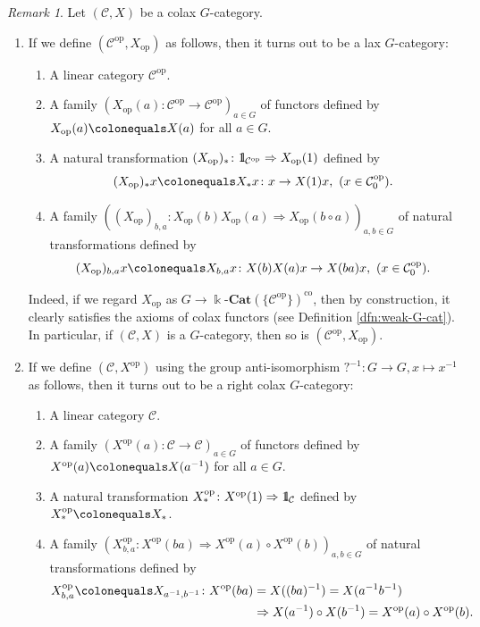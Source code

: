 \documentclass{surv-l}
\numberwithin{equation}{chapter}
\numberwithin{figure}{chapter}
\theoremstyle{plain}
\theoremstyle{definition}
\theoremstyle{remark}
\newtheorem{rmk}[thm]{Remark}
\newcommand{\id}{1\kern-.25em{\text{{\rm l}}}}
\newcommand{\kCat}{\Bbbk\text{-}\mathbf{Cat}}
\begin{document}
\begin{rmk}\label{rmk:op-action}
Let $({\mathcal{C}}, X)$ be a colax $G$-category.
\begin{enumerate}
\item
If we define $({\mathcal{C}}^{\mathrm{op}}, X_\mathrm{op})$ as follows,
then it turns out to be a lax $G$-category:
\begin{enumerate}
\item
A linear category ${\mathcal{C}}^{\mathrm{op}}$.
\item
A family $(X_\mathrm{op}(a)\colon {\mathcal{C}}^{\mathrm{op}} \to {\mathcal{C}}^{\mathrm{op}})_{a\in G}$ of functors
defined by $X_\mathrm{op}(a)\colonequals  X(a)$ for all $a \in G$.
\item
A natural transformation $(X_\mathrm{op})_*\colon \id_{{\mathcal{C}}^{\mathrm{op}}} \Rightarrow X_\mathrm{op}(1)$
defined by
\[
(X_\mathrm{op})_*x\colonequals  X_*x \colon x \to X(1)x, \ (x \in {\mathcal{C}}^{\mathrm{op}}_0).
\]
\item
A family $((X_\mathrm{op})_{b,a} \colon X_\mathrm{op}(b)X_\mathrm{op}(a) \Rightarrow X_\mathrm{op}(b \circ a))_{a,b \in G}$
of natural transformations defined by
\[
(X_\mathrm{op})_{b,a}x\colonequals  X_{b,a}x \colon X(b)X(a)x \to X(ba)x, \ (x \in {\mathcal{C}}^{\mathrm{op}}_0).
\]
\end{enumerate}
Indeed, if we regard $X_\mathrm{op}$ as $G \to \kCat(\{{\mathcal{C}}^{\mathrm{op}}\})^{\mathrm{co}}$,
then by construction,
it clearly satisfies
the axioms of colax functors (see Definition \ref{dfn:weak-G-cat}).
In particular,
if $({\mathcal{C}}, X)$ is a $G$-category, then so is $({\mathcal{C}}^{\mathrm{op}}, X_\mathrm{op})$.
\item
If we define $({\mathcal{C}}, X^{\mathrm{op}})$ using the group anti-isomorphism
$?^{-1}\colon G \to G, x \mapsto x^{-1}$ as follows, then it turns out to be
a right colax $G$-category:
\begin{enumerate}
\item
A linear category ${\mathcal{C}}$.
\item
A family $(X^{\mathrm{op}}(a)\colon {\mathcal{C}} \to {\mathcal{C}})_{a\in G}$ of functors defined by
$X^{\mathrm{op}}(a)\colonequals  X(a^{-1})$ for all $a \in G$.
\item
A natural transformation $X^{\mathrm{op}}_*\colon X^{\mathrm{op}}(1) \Rightarrow \id_{{\mathcal{C}}}$
defined by $X^{\mathrm{op}}_*\colonequals  X_*$.
\item
A family $(X^{\mathrm{op}}_{b,a} \colon X^{\mathrm{op}}(ba) \Rightarrow X^{\mathrm{op}}(a) \circ X^{\mathrm{op}}(b))_{a,b \in G}$
of natural transformations defined by
\[
\begin{aligned}
X^{\mathrm{op}}_{b,a}\colonequals  X_{a^{-1}, b^{-1}} \colon X^{\mathrm{op}}(ba) &= X((ba)^{-1}) = X(a^{-1} b^{-1})\\
&\Rightarrow X(a^{-1})\circ X(b^{-1}) = X^{\mathrm{op}}(a) \circ X^{\mathrm{op}}(b).
\end{aligned}
\]
\end{enumerate}


\end{enumerate}
\end{rmk}
\end{document}
